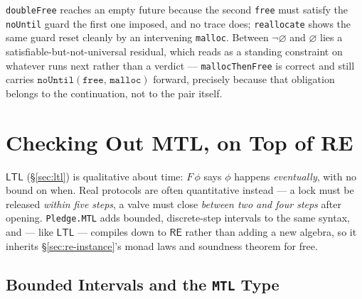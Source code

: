 \documentclass[acmsmall,screen]{acmart}
\newcommand{\RE}{\mathsf{RE}}
\newcommand{\LTL}{\mathsf{LTL}}
\newcommand{\noUntil}[2]{\mathtt{noUntil}(#1,\,#2)}
\newcommand{\univ}{\neg\varnothing}
\begin{document}
\noindent
\lstinline{doubleFree} reaches an empty future because the second
\lstinline{free} must satisfy the \lstinline{noUntil} guard the first one
imposed, and no trace does; \lstinline{reallocate} shows the same guard
reset cleanly by an intervening \lstinline{malloc}.
Between $\univ$ and $\varnothing$ lies a satisfiable-but-not-universal
residual, which reads as a standing constraint on whatever runs next rather
than a verdict --- \lstinline{mallocThenFree} is correct and still carries
$\noUntil{\mathtt{free}}{\mathtt{malloc}}$ forward, precisely because that
obligation belongs to the continuation, not to the pair itself.

\section{Checking Out MTL, on Top of RE}
\label{sec:mtl}

$\LTL$ (\S\ref{sec:ltl}) is qualitative about time: $F\,\phi$ says $\phi$
happens \emph{eventually}, with no bound on when.
Real protocols are often quantitative instead --- a lock must be released
\emph{within five steps}, a valve must close \emph{between two and four
steps} after opening.
\lstinline{Pledge.MTL} adds bounded, discrete-step intervals to the same
syntax, and --- like $\LTL$ --- compiles down to $\RE$ rather than adding a
new algebra, so it inherits \S\ref{sec:re-instance}'s monad laws and
soundness theorem for free.

\subsection{Bounded Intervals and the \texttt{MTL} Type}
\end{document}
